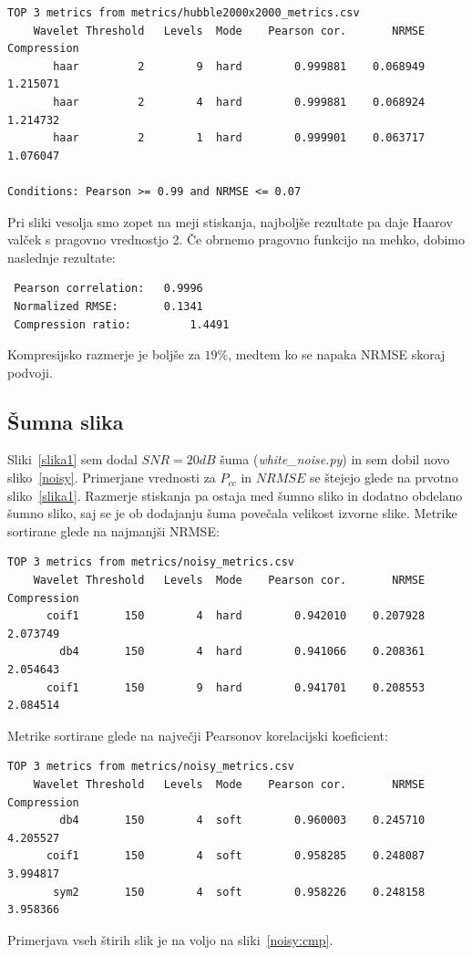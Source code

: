 \documentclass[a4paper,11pt]{article}
\begin{document}
\begin{verbatim}
TOP 3 metrics from metrics/hubble2000x2000_metrics.csv
	Wavelet	Threshold	Levels	Mode 	Pearson cor.	   NRMSE 	Compression
	   haar	        2	     9	hard	    0.999881 	0.068949	   1.215071
	   haar	        2	     4	hard	    0.999881 	0.068924	   1.214732
	   haar	        2	     1	hard	    0.999901 	0.063717	   1.076047

Conditions: Pearson >= 0.99	and	NRMSE <= 0.07
\end{verbatim}
Pri sliki vesolja smo zopet na meji stiskanja, najboljše rezultate pa daje Haarov valček s pragovno vrednostjo 2. Če obrnemo pragovno funkcijo na mehko, dobimo naslednje rezultate:
\begin{verbatim}
 Pearson correlation:	0.9996
 Normalized RMSE: 		0.1341
 Compression ratio: 		1.4491
\end{verbatim}
Kompresijsko razmerje je boljše za $19\%$, medtem ko se napaka NRMSE skoraj podvoji.

\subsection{Šumna slika}

Sliki~\ref{slika1} sem dodal $SNR=20dB$ šuma (\textit{white\_noise.py}) in sem dobil novo sliko~\ref{noisy}. Primerjane vrednosti za $P_{cc}$ in $NRMSE$ se štejejo glede na prvotno sliko~\ref{slika1}. Razmerje stiskanja pa ostaja med šumno sliko in dodatno obdelano šumno sliko, saj se je ob dodajanju šuma povečala velikost izvorne slike.
Metrike sortirane glede na najmanjši NRMSE:
\begin{verbatim}
TOP 3 metrics from metrics/noisy_metrics.csv
	Wavelet	Threshold	Levels	Mode	Pearson cor.	   NRMSE 	Compression
	  coif1	      150	     4	hard	    0.942010 	0.207928	   2.073749
	    db4	      150	     4	hard	    0.941066 	0.208361	   2.054643
	  coif1	      150	     9	hard	    0.941701 	0.208553	   2.084514
\end{verbatim}
Metrike sortirane glede na največji Pearsonov korelacijski koeficient:
\begin{verbatim}
TOP 3 metrics from metrics/noisy_metrics.csv
	Wavelet	Threshold	Levels	Mode	Pearson cor.	   NRMSE 	Compression
	    db4	      150	     4	soft	    0.960003 	0.245710	   4.205527
	  coif1	      150	     4	soft	    0.958285 	0.248087	   3.994817
	   sym2	      150	     4	soft	    0.958226 	0.248158	   3.958366
\end{verbatim}
Primerjava vseh štirih slik je na voljo na sliki~\ref{noisy:cmp}.
\end{document}
